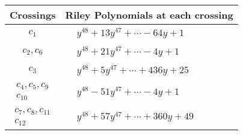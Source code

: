 \documentclass[1p]{elsarticle_modified}
\theoremstyle{definition}
\begin{document}
\begin{tabular}{m{50pt}|m{274pt}}
Crossings & \hspace{64pt}Riley Polynomials at each crossing \\
\hline $$\begin{aligned}c_{1}\end{aligned}$$&$\begin{aligned}
&y^{48}+13 y^{47}+\cdots-64 y+1
\end{aligned}$\\
\hline $$\begin{aligned}c_{2},c_{6}\end{aligned}$$&$\begin{aligned}
&y^{48}+21 y^{47}+\cdots-4 y+1
\end{aligned}$\\
\hline $$\begin{aligned}c_{3}\end{aligned}$$&$\begin{aligned}
&y^{48}+5 y^{47}+\cdots+436 y+25
\end{aligned}$\\
\hline $$\begin{aligned}c_{4},c_{5},c_{9}\\c_{10}\end{aligned}$$&$\begin{aligned}
&y^{48}-51 y^{47}+\cdots-4 y+1
\end{aligned}$\\
\hline $$\begin{aligned}c_{7},c_{8},c_{11}\\c_{12}\end{aligned}$$&$\begin{aligned}
&y^{48}+57 y^{47}+\cdots+360 y+49
\end{aligned}$\\
\hline
\end{tabular}
\vskip 2pc
\end{document}
